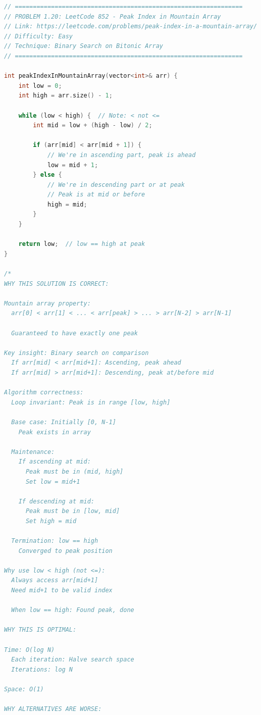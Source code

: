 \documentclass[11pt,a4paper,oneside]{book}
\begin{document}
\begin{lstlisting}[language=C++, caption=Complete Application Solutions]
// ===============================================================
// PROBLEM 1.20: LeetCode 852 - Peak Index in Mountain Array
// Link: https://leetcode.com/problems/peak-index-in-a-mountain-array/
// Difficulty: Easy
// Technique: Binary Search on Bitonic Array
// ===============================================================

int peakIndexInMountainArray(vector<int>& arr) {
    int low = 0;
    int high = arr.size() - 1;
    
    while (low < high) {  // Note: < not <=
        int mid = low + (high - low) / 2;
        
        if (arr[mid] < arr[mid + 1]) {
            // We're in ascending part, peak is ahead
            low = mid + 1;
        } else {
            // We're in descending part or at peak
            // Peak is at mid or before
            high = mid;
        }
    }
    
    return low;  // low == high at peak
}

/*
WHY THIS SOLUTION IS CORRECT:

Mountain array property:
  arr[0] < arr[1] < ... < arr[peak] > ... > arr[N-2] > arr[N-1]
  
  Guaranteed to have exactly one peak

Key insight: Binary search on comparison
  If arr[mid] < arr[mid+1]: Ascending, peak ahead
  If arr[mid] > arr[mid+1]: Descending, peak at/before mid

Algorithm correctness:
  Loop invariant: Peak is in range [low, high]
  
  Base case: Initially [0, N-1]
    Peak exists in array 
  
  Maintenance:
    If ascending at mid:
      Peak must be in (mid, high]
      Set low = mid+1 
    
    If descending at mid:
      Peak must be in [low, mid]
      Set high = mid 
  
  Termination: low == high
    Converged to peak position 

Why use low < high (not <=):
  Always access arr[mid+1]
  Need mid+1 to be valid index
  
  When low == high: Found peak, done

WHY THIS IS OPTIMAL:

Time: O(log N)
  Each iteration: Halve search space
  Iterations: log N

Space: O(1)

WHY ALTERNATIVES ARE WORSE:


\end{lstlisting}
\end{document}
